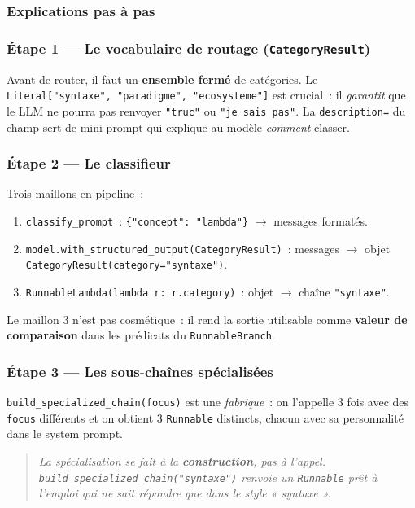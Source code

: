 \documentclass[11pt,a4paper]{article}
\begin{document}
\subsubsection{Explications pas à pas}

\subsubsection*{Étape 1 — Le vocabulaire de routage (\texttt{CategoryResult})}

Avant de router, il faut un \textbf{ensemble fermé} de catégories. Le
\texttt{Literal["syntaxe", "paradigme", "ecosysteme"]} est crucial~:
il \emph{garantit} que le LLM ne pourra pas renvoyer \texttt{"truc"} ou
\texttt{"je sais pas"}. La \texttt{description=} du champ sert de
mini-prompt qui explique au modèle \emph{comment} classer.

\subsubsection*{Étape 2 — Le classifieur}

Trois maillons en pipeline~:
\begin{enumerate}[leftmargin=*]
  \item \texttt{classify\_prompt}~: \texttt{\{"concept": "lambda"\}}
        $\rightarrow$ messages formatés.
  \item \texttt{model.with\_structured\_output(CategoryResult)}~:
        messages $\rightarrow$ objet \texttt{CategoryResult(category="syntaxe")}.
  \item \texttt{RunnableLambda(lambda r: r.category)}~: objet $\rightarrow$
        chaîne \texttt{"syntaxe"}.
\end{enumerate}

Le maillon 3 n'est pas cosmétique~: il rend la sortie utilisable comme
\textbf{valeur de comparaison} dans les prédicats du
\texttt{RunnableBranch}.

\subsubsection*{Étape 3 — Les sous-chaînes spécialisées}

\texttt{build\_specialized\_chain(focus)} est une \emph{fabrique}~: on
l'appelle 3 fois avec des \texttt{focus} différents et on obtient 3
\texttt{Runnable} distincts, chacun avec sa personnalité dans le system
prompt.

\begin{quote}\itshape
La spécialisation se fait à la \textbf{construction}, pas à l'appel.
\texttt{build\_specialized\_chain("syntaxe")} renvoie un \texttt{Runnable}
prêt à l'emploi qui ne sait répondre que dans le style « syntaxe ».
\end{quote}
\end{document}

